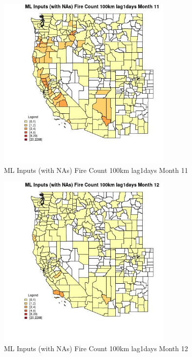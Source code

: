 \begin{figure} 
\centering  
\includegraphics[width=0.77\textwidth]{Code_Outputs/Report_ML_input_PM25_Step4_part_e_de_duplicated_aves_compiled_2019-05-20wNAs_CountyFire_Count_100km_lag1daysmedianMonth11.jpg} 
\caption{\label{fig:Report_ML_input_PM25_Step4_part_e_de_duplicated_aves_compiled_2019-05-20wNAsCountyFire_Count_100km_lag1daysmedianMonth11}ML Inputs (with NAs) Fire Count 100km lag1days Month 11} 
\end{figure} 
 

\begin{figure} 
\centering  
\includegraphics[width=0.77\textwidth]{Code_Outputs/Report_ML_input_PM25_Step4_part_e_de_duplicated_aves_compiled_2019-05-20wNAs_CountyFire_Count_100km_lag1daysmedianMonth12.jpg} 
\caption{\label{fig:Report_ML_input_PM25_Step4_part_e_de_duplicated_aves_compiled_2019-05-20wNAsCountyFire_Count_100km_lag1daysmedianMonth12}ML Inputs (with NAs) Fire Count 100km lag1days Month 12} 
\end{figure} 
 

